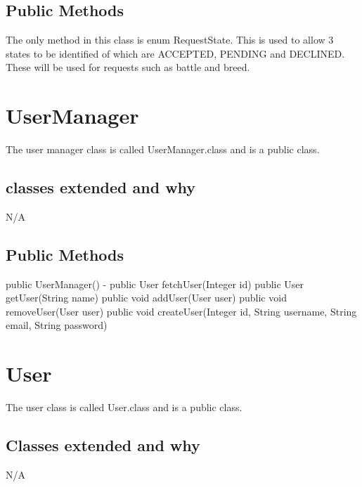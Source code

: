 \documentclass{project}
\begin{document}
\subsection{Public Methods}
The only method in this class is enum RequestState. This is used to allow 3 states to be identified of which are ACCEPTED, PENDING and DECLINED. These will be used for requests such as battle and breed.

\section{UserManager}
The user manager class is called UserManager.class and is a public class.
\subsection{classes extended and why}
N/A
\subsection{Public Methods}
public UserManager() - 
public User fetchUser(Integer id)
public User getUser(String name)
public void addUser(User user)
public void removeUser(User user)
public void createUser(Integer id, String username, String email, String password)


\section{User}
The user class is called User.class and is a public class.
\subsection{Classes extended and why}
N/A
\end{document}
